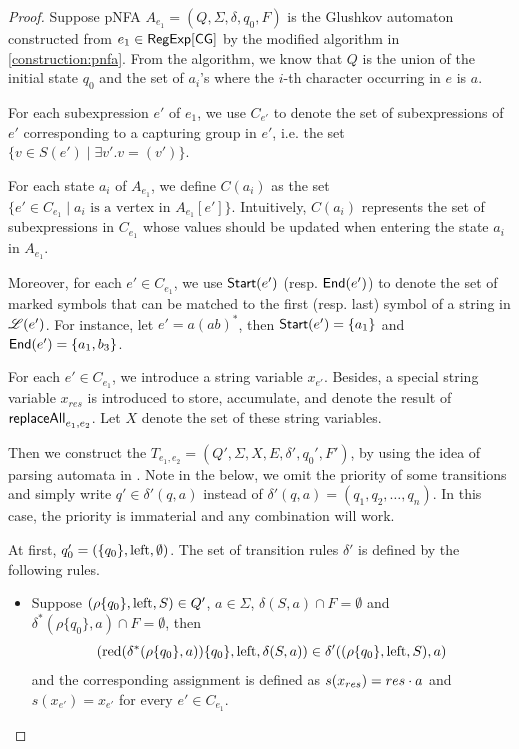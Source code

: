\begin{proof}

Suppose pNFA $A_{e_1} =(Q, \Sigma,  \delta, q_0, F)$ is the Glushkov automaton constructed from $e_1 \in {\sf RegExp}[\sf CG]$ by the modified algorithm in \ref{construction:pnfa}. From the algorithm, we know that $Q$ is the union of the initial state $q_0$ and the set of $a_i$'s where the $i$-th character occurring in $e$ is $a$.

For each subexpression $e'$ of $e_1$, we use $C_{e'}$ to denote the set of subexpressions of $e'$ corresponding to a capturing group in $e'$, i.e. the set $\{v \in S(e')\mid \exists v'. v=(v')\}$.

For each state $a_i$ of $A_{e_1}$, we define $C(a_i)$  as the set $\{ e' \in C_{e_1} \mid a_i \mbox{ is a vertex in }
A_{e_1}[e']\}$. Intuitively, $C(a_i)$ represents the set of subexpressions in $C_{e_1}$ whose values should be updated when entering the state $a_i$ in $A_{e_1}$. 

Moreover, for each $e' \in C_{e_1}$, we use ${\sf Start}(e')$ (resp. ${\sf End}(e')$) to denote the set of marked symbols that can be matched to the first  (resp. last) symbol of a string in $\mathscr{L}(e')$. For instance, let $e' = a(ab)^*$, then ${\sf Start}(e') = \{a_1\}$ and ${\sf End}(e') = \{a_1, b_3\}$. 

For each $e' \in C_{e_1}$, we introduce a string variable $x_{e'}$. Besides, a special string variable $x_{res}$ is introduced to store, accumulate, and denote the result of $\mathsf{replaceAll}_{e_1,e_2}$. Let $X$ denote the set of these string variables.


Then we construct the \PSST{} $T_{e_1,e_2} = (Q', \Sigma, X, E, \delta', q_0', F')$, by using the idea of parsing automata in \cite{CCH+18}. Note in the below, we omit the priority of some transitions and simply write $q' \in \delta'(q,a)$ instead of $\delta'(q,a)=(q_1,q_2,\ldots,q_n)$. In this case, the priority is immaterial and any combination will work.

At first, $q'_0= (\{ q_0
\}, \operatorname{left}, \emptyset)$. The set of transition rules $\delta'$ is defined by the following rules.

\begin{itemize}
  
  \item Suppose $(\rho \{ q_0 \}, \operatorname{left}, S) \in Q'$, $a \in \Sigma$,
  $\delta (S, a) \cap F = \emptyset$ and $\delta^{\ast} (\rho \{ q_0 \}, a) \cap F =
  \emptyset$, then
  \[ (\operatorname{red} (\delta^{\ast} (\rho \{ q_0 \}, a)) \{ q_0 \}, \operatorname{left}, \delta
     (S, a)) \in \delta' ((\rho \{ q_0 \}, \operatorname{left}, S), a) \]
  and the corresponding assignment is defined as $s(x_{res}) = res \cdot a$ and $s(x_{e'})=x_{e'}$ for
  every $e' \in C_{e_1}$.
  

\end{itemize}
\end{proof}
